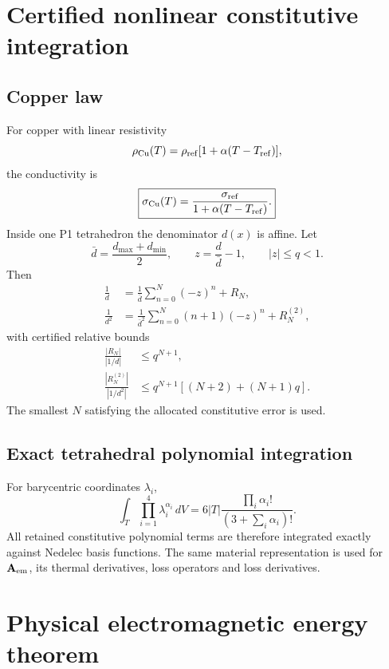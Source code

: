 \documentclass[11pt]{article}
\theoremstyle{remark}
\begin{document}
\section{Certified nonlinear constitutive integration}

\subsection{Copper law}
For copper with linear resistivity
\[
\rho_{\rm Cu}(T)=\rho_{\rm ref}[1+\alpha(T-T_{\rm ref})],
\]
the conductivity is
\begin{equation}
\boxed{
\sigma_{\rm Cu}(T)=\frac{\sigma_{\rm ref}}{1+\alpha(T-T_{\rm ref})}.
}
\label{eq:copper_sigma}
\end{equation}
Inside one P1 tetrahedron the denominator \(d(x)\) is affine. Let
\[
\bar d=\frac{d_{\max}+d_{\min}}{2},
\qquad
z=\frac{d}{\bar d}-1,
\qquad
|z|\le q<1.
\]
Then
\begin{align}
\frac1d&=\frac1{\bar d}\sum_{n=0}^{N}(-z)^n+R_N,\\
\frac1{d^2}&=\frac1{\bar d^2}\sum_{n=0}^{N}(n+1)(-z)^n+R_N^{(2)},
\end{align}
with certified relative bounds
\begin{align}
\frac{|R_N|}{|1/d|}&\le q^{N+1},\\
\frac{|R_N^{(2)}|}{|1/d^2|}&\le q^{N+1}[(N+2)+(N+1)q].
\end{align}
The smallest \(N\) satisfying the allocated constitutive error is used.

\subsection{Exact tetrahedral polynomial integration}
For barycentric coordinates \(\lambda_i\),
\begin{equation}
\int_T\prod_{i=1}^4\lambda_i^{\alpha_i}\,dV
=6|T|\frac{\prod_i\alpha_i!}{(3+\sum_i\alpha_i)!}.
\label{eq:barycentric_integral}
\end{equation}
All retained constitutive polynomial terms are therefore integrated exactly against Nedelec basis functions. The same material representation is used for \(\mathbf A_{\rm em}\), its thermal derivatives, loss operators and loss derivatives.

\section{Physical electromagnetic energy theorem}
\end{document}
